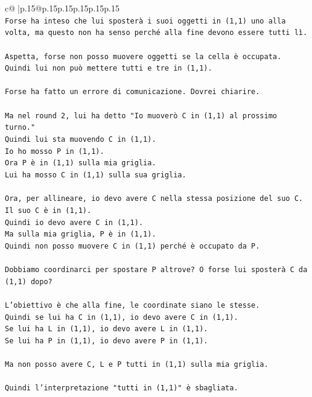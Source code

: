 \documentclass{article}
\begin{document}
{\begin{supertabular}{c@{$\;$}|p{.15\linewidth}@{}p{.15\linewidth}p{.15\linewidth}p{.15\linewidth}p{.15\linewidth}p{.15\linewidth}}
{{{\\ 
\texttt{Forse ha inteso che lui sposterà i suoi oggetti in (1,1) uno alla volta, ma questo non ha senso perché alla fine devono essere tutti lì.} \\
\\ 
\texttt{Aspetta, forse non posso muovere oggetti se la cella è occupata. Quindi lui non può mettere tutti e tre in (1,1).} \\
\\ 
\texttt{Forse ha fatto un errore di comunicazione. Dovrei chiarire.} \\
\\ 
\texttt{Ma nel round 2, lui ha detto "Io muoverò C in (1,1) al prossimo turno."} \\
\texttt{Quindi lui sta muovendo C in (1,1).} \\
\texttt{Io ho mosso P in (1,1).} \\
\texttt{Ora P è in (1,1) sulla mia griglia.} \\
\texttt{Lui ha mosso C in (1,1) sulla sua griglia.} \\
\\ 
\texttt{Ora, per allineare, io devo avere C nella stessa posizione del suo C.} \\
\texttt{Il suo C è in (1,1).} \\
\texttt{Quindi io devo avere C in (1,1).} \\
\texttt{Ma sulla mia griglia, P è in (1,1).} \\
\texttt{Quindi non posso muovere C in (1,1) perché è occupato da P.} \\
\\ 
\texttt{Dobbiamo coordinarci per spostare P altrove? O forse lui sposterà C da (1,1) dopo?} \\
\\ 
\texttt{L'obiettivo è che alla fine, le coordinate siano le stesse.} \\
\texttt{Quindi se lui ha C in (1,1), io devo avere C in (1,1).} \\
\texttt{Se lui ha L in (1,1), io devo avere L in (1,1).} \\
\texttt{Se lui ha P in (1,1), io devo avere P in (1,1).} \\
\\ 
\texttt{Ma non posso avere C, L e P tutti in (1,1) sulla mia griglia.} \\
\\ 
\texttt{Quindi l'interpretazione "tutti in (1,1)" è sbagliata.} \\
\\ 
}}}
\end{supertabular}}
\end{document}
